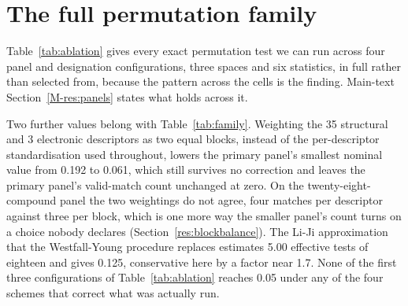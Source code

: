 \documentclass[journal=jacsat,manuscript=suppinfo,margin=1in]{achemso}
\begin{document}
\section{The full permutation family}
\label{res:permfull}

Table~\ref{tab:ablation} gives every exact permutation test we can run across
four panel and designation configurations, three spaces and six statistics, in
full rather than selected from, because the pattern across the cells is the
finding. Main-text Section~\ref{M-res:panels} states what holds across it.



Two further values belong with Table~\ref{tab:family}. Weighting the 35
structural and 3 electronic descriptors as two equal blocks, instead of the
per-descriptor standardisation used throughout, lowers the primary panel's
smallest nominal value from 0.192 to 0.061, which still survives no correction
and leaves the primary panel's valid-match count unchanged at zero. On the
twenty-eight-compound panel the two weightings do not agree, four matches per
descriptor against three per block, which is one more way the smaller panel's
count turns on a choice nobody declares (Section~\ref{res:blockbalance}).
The Li-Ji approximation that the Westfall-Young procedure replaces estimates
5.00 effective tests of eighteen and gives 0.125, conservative here by a factor
near 1.7. None of the first three configurations of Table~\ref{tab:ablation}
reaches 0.05 under any of the four schemes that correct what was actually run.

\begin{table}[!htb]
\centering
\caption{Six ways of accounting for the search, applied to the eighteen tests
of each panel configuration. The Westfall-Young min-$P$ value
\cite{westfall1993} is exact for the dependence among the tests, since all
eighteen share one enumeration of designations; $m_{\mathrm{eff}}$ approximates
that dependence from the eigenvalues of the correlation matrix of the eighteen
nulls \cite{liji2005}, used as a Bonferroni divisor. On the primary panel no
scheme returns anything below 0.05 and on the smaller panel only the
pre-specified-statistic scheme does, while the fourth configuration, which
differs from the second by two class labels, is below 0.05 under every scheme.}
\label{tab:family}
\small
\setlength{\tabcolsep}{4pt}

\end{table}
\end{document}
